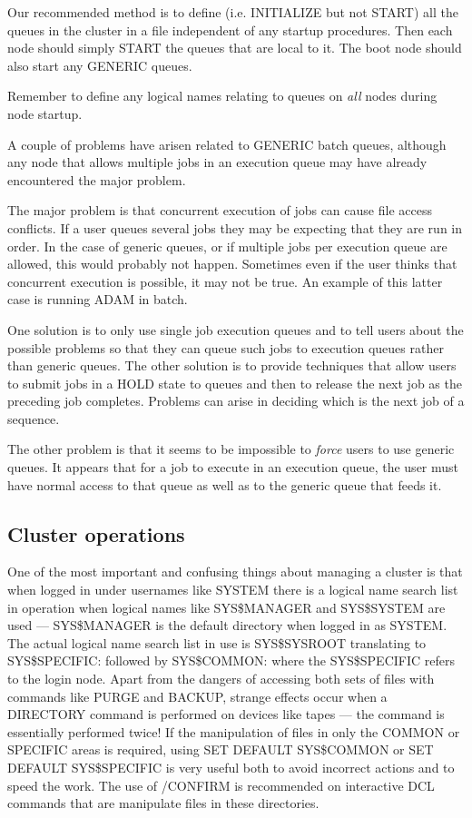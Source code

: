 Our recommended method is to define (i.e. INITIALIZE but not START) all the
queues in the cluster in a file independent of any startup procedures.
Then each node should simply START the queues that are local to it.
The boot node should also start any GENERIC queues.

Remember to define any logical names relating to queues on {\em all} nodes
during node startup.

A couple of problems have arisen related to GENERIC batch queues, although
any node that allows multiple jobs in an execution queue may have already
encountered the major problem.

The major problem is that concurrent execution of jobs can cause file access
conflicts.
If a user queues several jobs they may be expecting that they are run in order.
In the case of generic queues, or if multiple jobs per execution queue are
allowed, this would probably not happen.
Sometimes even if the user thinks that concurrent execution is possible, it
may not be true.
An example of this latter case is running ADAM in batch.

One solution is to only use single job execution queues and to tell users
about the possible problems so that they can queue such jobs to execution
queues rather than generic queues.
The other solution is to provide techniques that allow users to submit jobs
in a HOLD state to queues and then to release the next job as the preceding
job completes.
Problems can arise in deciding which is the next job of a sequence.

The other problem is that it seems to be impossible to {\em force} users to
use generic queues.
It appears that for a job to execute in an execution queue, the user must have
normal access to that queue as well as to the generic queue that feeds it.

\subsection {Cluster operations}

One of the most important and confusing things about managing a cluster is that
when logged in under usernames like SYSTEM there is a logical name search list
in operation when logical names like SYS\$MANAGER and SYS\$SYSTEM are used ---
SYS\$MANAGER is the default directory when logged in as SYSTEM.
The actual logical name search list in use is SYS\$SYSROOT translating to 
SYS\$SPECIFIC: followed by SYS\$COMMON: where the SYS\$SPECIFIC refers to
the login node.
Apart from the dangers of accessing both sets of files with commands like PURGE
and BACKUP, strange effects occur when a DIRECTORY command is performed on
devices like tapes --- the command is essentially performed twice!
If the manipulation of files in only the COMMON or SPECIFIC areas is required,
using SET DEFAULT SYS\$COMMON or SET DEFAULT SYS\$SPECIFIC is very useful both
to avoid incorrect actions and to speed the work.
The use of /CONFIRM is recommended on interactive DCL commands that are
manipulate files in these directories.

